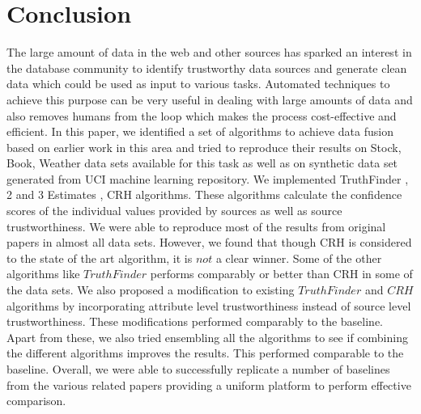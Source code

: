 \documentclass{acm_proc_article-sp}
\begin{document}
\section{Conclusion}
The large amount of data in the web and other sources has sparked an interest in the database community to identify trustworthy data sources and generate clean data which could be used as input to various tasks. Automated techniques to achieve this purpose can be very useful in dealing with large amounts of data and also removes humans from the loop  which makes the process cost-effective and efficient.  In this paper, we identified a set of algorithms to achieve data fusion based on earlier work in this area and tried to reproduce their results on Stock, Book, Weather data sets available for this task as well as on synthetic data set generated from UCI machine learning repository. We implemented TruthFinder \cite{yin:truth}, 2 and 3 Estimates \cite{galland:corro} ,  CRH  \cite{li:resolving} algorithms. These algorithms calculate the confidence scores of the individual values provided by sources as well as source trustworthiness. We were able to reproduce most of the results from original papers in almost all data sets. However, we found that though CRH is considered to the state of the art algorithm, it is $not$ a clear winner. Some of the other algorithms like $TruthFinder$ performs comparably or better than CRH in some of the data sets. We also proposed a modification to existing $TruthFinder$ and $CRH$ algorithms by incorporating attribute level trustworthiness instead of source level trustworthiness. These modifications performed comparably to the baseline. Apart from these, we also tried ensembling all the algorithms to see if combining the different algorithms improves the results. This performed comparable to the baseline. Overall, we were able to successfully replicate a number of baselines from the various related papers providing a uniform platform to perform effective comparison.   



  

\balancecolumns
\end{document}

